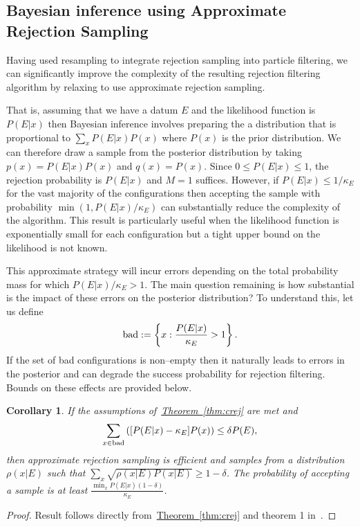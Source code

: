 \documentclass[twoside]{article}
\newtheorem{corollary}{Corollary}
\newcommand{\thm}[1]{\hyperref[thm:#1]{Theorem~\ref*{thm:#1}}}
\begin{document}
\subsection{Bayesian inference using Approximate Rejection Sampling}

Having used resampling to integrate rejection sampling into particle filtering,
we can significantly improve the complexity of the resulting rejection filtering
algorithm by relaxing to use approximate rejection sampling.

That is, assuming that we have a datum $E$ and the likelihood function is $P(E|x)$ then Bayesian inference
involves preparing the a distribution that is proportional to $\sum_x P(E|x) P(x)$ where $P(x)$ is the
prior distribution.  We can therefore draw a sample from the posterior distribution by taking
$p(x)=P(E|x)P(x)$ and $q(x)=P(x)$.  Since $0\le P(E|x)\le 1$, the rejection probability is $P(E|x)$ and
$M=1$ suffices.  However, if $P(E|x)\le 1/\kappa_E$ for the vast majority of the configurations then
accepting the sample with probability $\min(1,P(E|x)/\kappa_E)$  can substantially reduce the 
complexity of the algorithm.  This result is particularly useful when the likelihood function is exponentially
small for each configuration but a tight upper bound on the likelihood is not known.

This approximate strategy will incur errors depending on the total probability mass
for which $P(E|x)/\kappa_E >1$.   The main question remaining is how substantial is the
impact of these errors on the posterior distribution?  To understand this, let us define
\begin{equation}
{\rm bad} := \left\{x: \frac{P(E|x)}{\kappa_E} >1\right\}.
\end{equation}
If the set of bad configurations is non--empty then it naturally leads to errors in the posterior and
can degrade the success probability for rejection filtering.  Bounds on these effects are
provided below.

\begin{corollary}\label{cor:badalgorithm}
If the assumptions of~\thm{crej} are met and
$$\sum_{x\in {\rm bad}}  \left([P(E|x)-\kappa_E] P(x)\right) \le \delta P(E),$$
  then approximate rejection sampling is  efficient and samples from a distribution $\rho(x|E)$ such that ${\sum_x \sqrt{\rho(x|E) P(x|E)}} \ge 1-\delta$.
The probability of accepting a sample is at least $\frac{\min_x P(E|x) (1-\delta)}{\kappa_E}$.\label{thm:kappa}
\end{corollary}
\begin{proof}
Result follows directly from~\thm{crej} and theorem 1 in~\cite{WKGS15}.
\end{proof}
\end{document}
